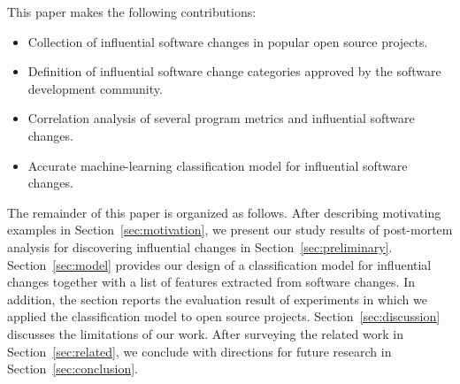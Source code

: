 This paper makes the following contributions:

\begin{itemize}
\itemsep0em 
	\item Collection of influential software changes in popular open source projects.
	\item Definition of influential software change categories approved by the software development community.
	\item Correlation analysis of several program metrics and influential software
changes.
	\item Accurate machine-learning classification model for influential software changes.
\end{itemize}

The remainder of this paper is organized as follows. After describing motivating
examples in Section~\ref{sec:motivation}, we present our study results of
post-mortem analysis for discovering influential changes in
Section~\ref{sec:preliminary}.
Section~\ref{sec:model} provides our design of a classification model for
influential changes together with a list of features extracted from software changes.
In addition, the section reports the evaluation result of experiments in which
we applied the classification model to open source projects.
Section~\ref{sec:discussion} discusses the limitations of our work.
After surveying the related work in Section~\ref{sec:related}, 
we conclude with directions for future research in
Section~\ref{sec:conclusion}.
